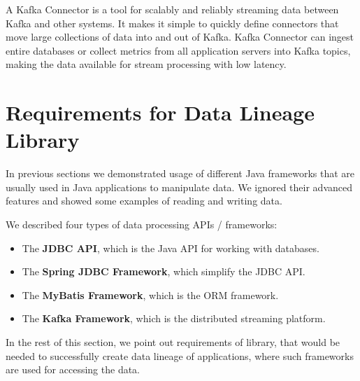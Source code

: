 A Kafka Connector is a tool for scalably and reliably streaming data between Kafka
and other systems. It makes it simple to quickly define connectors that move
large collections of data into and out of Kafka.
Kafka Connector can ingest entire databases or collect metrics from all
application servers into Kafka topics, making the data available
for stream processing with low latency.




\section{Requirements for Data Lineage Library \label{frameworks:requirements}}

In previous sections we demonstrated usage of different Java frameworks
that are usually used in Java applications to manipulate data.
We ignored their advanced features and showed some examples of reading
and writing data.

We described four types of data processing APIs / frameworks:
\begin{itemize}
  \item The \textbf{JDBC API}, which is the Java API for working with databases.
  \item The \textbf{Spring JDBC Framework}, which simplify the JDBC API.
  \item The \textbf{MyBatis Framework}, which is the ORM framework.
  \item The \textbf{Kafka Framework}, which is the distributed streaming platform.
\end{itemize}

In the rest of this section, we point out requirements of library, that
would be needed to successfully create data lineage of applications,
where such frameworks are used for accessing the data.

